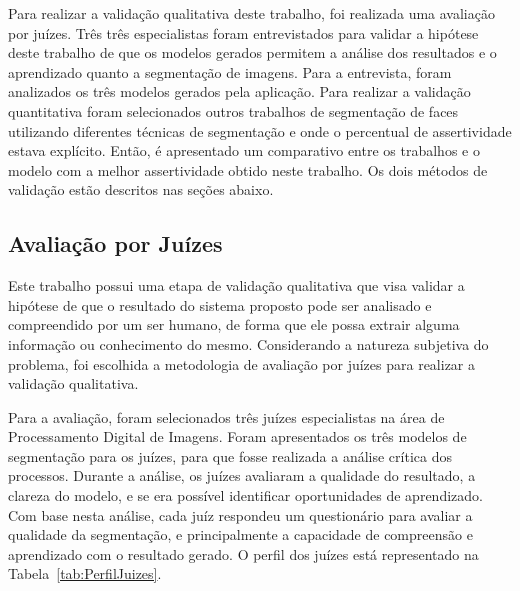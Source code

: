 \documentclass[12pt,oneside,a4paper,english,french,spanish,brazil,]{abntex2}
\begin{document}
Para realizar a validação qualitativa deste trabalho, foi realizada uma avaliação por juízes. Três três especialistas foram entrevistados para validar a hipótese deste trabalho de que os modelos gerados permitem a análise dos resultados e o aprendizado quanto a segmentação de imagens. Para a entrevista, foram analizados os três modelos gerados pela aplicação. Para realizar a validação quantitativa foram selecionados outros trabalhos de segmentação de faces utilizando diferentes técnicas de segmentação e onde o percentual de assertividade estava explícito. Então, é apresentado um comparativo entre os trabalhos e o modelo com a melhor assertividade obtido neste trabalho. Os dois métodos de validação estão descritos nas seções abaixo.

\subsection{Avaliação por Juízes}

Este trabalho possui uma etapa de validação qualitativa que visa validar a hipótese de que o resultado do sistema proposto pode ser analisado e compreendido por um ser humano, de forma que ele possa extrair alguma informação ou conhecimento do mesmo. Considerando a natureza subjetiva do problema, foi escolhida a metodologia de avaliação por juízes para realizar a validação qualitativa.

Para a avaliação, foram selecionados três juízes especialistas na área de Processamento Digital de Imagens. Foram apresentados os três modelos de segmentação para os juízes, para que fosse realizada a análise crítica dos processos. Durante a análise, os juízes avaliaram a qualidade do resultado, a clareza do modelo, e se era possível identificar oportunidades de aprendizado. Com base nesta análise, cada juíz respondeu um questionário para avaliar a qualidade da segmentação, e principalmente a capacidade de compreensão e aprendizado com o resultado gerado. O perfil dos juízes está representado na Tabela~\ref{tab:PerfilJuizes}.
\end{document}
